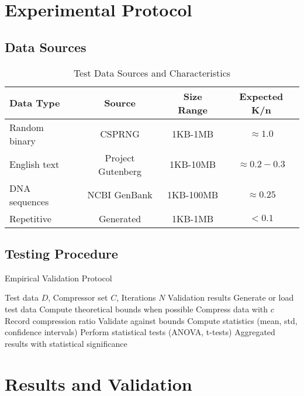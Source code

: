 \documentclass[12pt,a4paper]{report}
\begin{document}
\section{Experimental Protocol}

\subsection{Data Sources}

\begin{table}[h]
\centering
\caption{Test Data Sources and Characteristics}
\begin{tabular}{lccc}
\toprule
\textbf{Data Type} & \textbf{Source} & \textbf{Size Range} & \textbf{Expected K/n} \\
\midrule
Random binary & CSPRNG & 1KB-1MB & $\approx 1.0$ \\
English text & Project Gutenberg & 1KB-10MB & $\approx 0.2-0.3$ \\
DNA sequences & NCBI GenBank & 1KB-100MB & $\approx 0.25$ \\
Repetitive & Generated & 1KB-1MB & $< 0.1$ \\
\bottomrule
\end{tabular}
\end{table}

\subsection{Testing Procedure}

\begin{algorithm}
\caption{Empirical Validation Protocol}
\begin{algorithmic}[1]
\REQUIRE Test data $D$, Compressor set $C$, Iterations $N$
\ENSURE Validation results
    \STATE Generate or load test data
    \STATE Compute theoretical bounds when possible
            \STATE Compress data with $c$
            \STATE Record compression ratio
            \STATE Validate against bounds
        \ENDFOR
        \STATE Compute statistics (mean, std, confidence intervals)
    \ENDFOR
    \STATE Perform statistical tests (ANOVA, t-tests)
\ENDFOR
\RETURN Aggregated results with statistical significance
\end{algorithmic}
\end{algorithm}

\section{Results and Validation}
\end{document}
